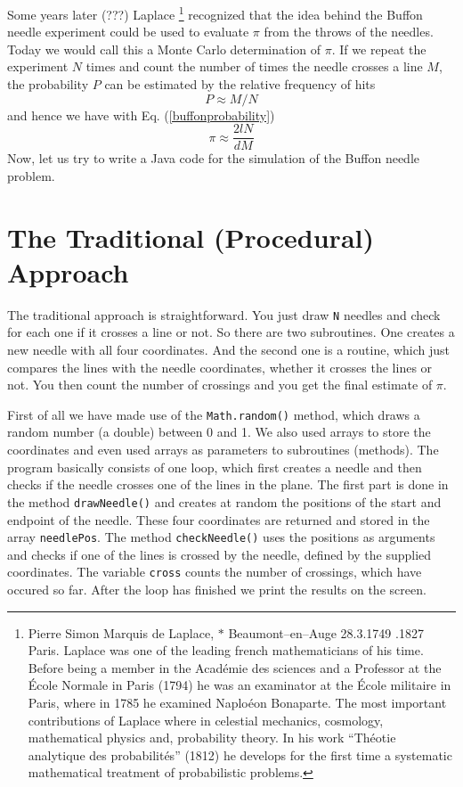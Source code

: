 Some years later (???) Laplace 
\footnote{Pierre Simon Marquis de Laplace, $\ast$ Beaumont--en--Auge
  28.3.1749 .1827 Paris. Laplace was one of the leading french
  mathematicians of his time. Before being a member in the Acad\'emie
  des sciences and a Professor at the \'Ecole Normale in Paris (1794)
he was an examinator at the \'Ecole militaire in Paris, where in 1785
he examined Naplo\'eon Bonaparte. The most important contributions of
Laplace where in celestial mechanics, cosmology, mathematical physics
and, probability theory. In his work ``Th\'eotie analytique des
probabilit\'es'' (1812) he develops  for the first time a systematic
mathematical treatment of probabilistic problems.} recognized that
the idea behind the Buffon needle experiment could be used to evaluate
$\pi$ from the throws of the needles. Today we would call this a
Monte Carlo determination of $\pi$. If we repeat the experiment $N$
times and count the number of times the needle crosses a line $M$, the
probability $P$ can be estimated by the relative frequency of hits
\begin{equation}
\label{buffonestimateP}
P \approx M/N
\end{equation}
and hence we have with Eq. (\ref{buffonprobability})
\begin{equation}
\pi \approx \frac{2lN}{dM}
\end{equation}
Now, let us try to write a Java code for the simulation of the Buffon
needle problem.

\section{The Traditional (Procedural) Approach}
The traditional approach is straightforward. You just
draw \verb|N| needles and check for each one if it crosses a
line or not. So there are two subroutines. One creates a new
needle with all four coordinates. And the second one is a 
routine, which just compares the lines with the needle coordinates,
whether it crosses the lines or not. You then count the number
of crossings and you get the final estimate of $\pi$.


First of all we have made use of the \verb|Math.random()| method, which
draws a random number (a double) between 0 and 1. We also used arrays
to store the coordinates and even used arrays as parameters to
subroutines (methods). The program basically consists of one loop,
which first creates a needle and then checks if the needle crosses
one of the lines in the plane. The first part is done in the method
\verb|drawNeedle()| and creates at random the positions of the start 
and endpoint of the needle. These four coordinates are returned and
stored in the array \verb|needlePos|. The method \verb|checkNeedle()|
uses the positions as arguments and checks if one of the lines is
crossed by the needle, defined by the supplied coordinates.
The variable \verb|cross| counts the number of crossings, which
have occured so far. After the loop has finished we print the
results on the screen.

